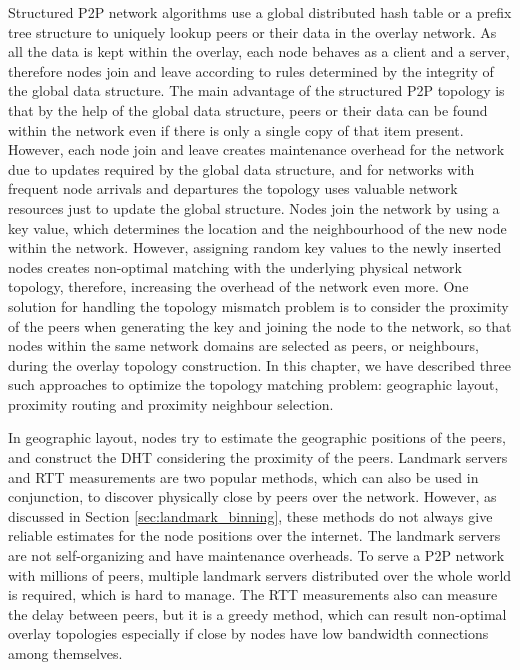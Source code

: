 Structured P2P network algorithms use a global distributed hash table or a
prefix tree structure to uniquely lookup peers or their data in the overlay
network. As all the data is kept within the overlay, each node behaves as a
client and a server, therefore nodes join and leave according to rules
determined by the integrity of the global data structure. The main advantage of
the structured P2P topology is that by the help of the global data structure,
peers or their data can be found within the network even if there is only a
single copy of that item present. However, each node join and leave creates
maintenance overhead for the network due to updates required by the global data
structure, and for networks with frequent node arrivals and departures the
topology uses valuable network resources just to update the global structure.
Nodes join the network by using a key value, which determines the location and
the neighbourhood of the new node within the network. However, assigning
random key values to the newly inserted nodes creates non-optimal matching with
the underlying physical network topology, therefore, increasing the overhead of
the network even more. One solution for handling the topology mismatch problem
is to consider the proximity of the peers when generating the key and joining
the node to the network, so that nodes within the same network domains are
selected as peers, or neighbours, during the overlay topology construction. In
this chapter, we have described three such approaches to optimize the topology
matching problem: geographic layout, proximity routing and proximity neighbour
selection.

In geographic layout, nodes try to estimate the geographic positions of the
peers, and construct the DHT considering the proximity of the peers. Landmark
servers and RTT measurements are two popular methods, which can also be used in
conjunction, to discover physically close by peers over the network. However, as
discussed in Section \ref{sec:landmark_binning}, these methods do not always
give reliable estimates for the node positions over the internet. The landmark
servers are not self-organizing and have maintenance overheads. To serve a
P2P network with millions of peers, multiple landmark servers
distributed over the whole world is required, which is hard to manage. The RTT
measurements also can measure the delay between peers, but it is a greedy method,
which can result non-optimal overlay topologies especially if close by nodes
have low bandwidth connections among themselves.

